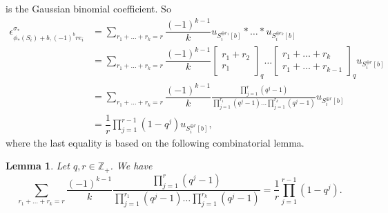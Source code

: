 \documentclass[a4paper,12pt]{amsart}
\numberwithin{equation}{section}
\newtheorem{lemma}[theorem]{Lemma}
\newcommand{\1}{\mathbf{1}}
\begin{document}
is the Gaussian binomial coefficient. So
\begin{align*}
    \epsilon^{\sigma_*}_{\phi_*(S_i)+b,(-1)^b re_i}
    &=\sum_{r_1+\dots+r_k=r}\dfrac{(-1)^{k-1}}{k}u_{S_i^{\oplus r_1}[b]}*\dots*u_{S_i^{\oplus r_k}[b]}\\
    &=\sum_{r_1+\dots+r_k=r}\dfrac{(-1)^{k-1}}{k}\left[\begin{array}{c}
     r_1+r_2  \\
     r_1 
\end{array}\right]_q\dots\left[\begin{array}{c}
     r_1+\dots+r_k  \\
     r_1+\dots+r_{k-1}
\end{array}\right]_q u_{S_i^{\oplus r}[b]}\\
&=\sum_{r_1+\dots+r_k=r}\dfrac{(-1)^{k-1}}{k}\frac{\displaystyle{\prod_{j=1}^{r}(q^j-1)}}{\displaystyle{\prod_{j=1}^{r_1}(q^j-1)\dots\prod_{j=1}^{r_k}(q^j-1)}}u_{S_i^{\oplus r}[b]}\\
&=\dfrac{1}{r}\prod_{j=1}^{r-1}(1-q^j)u_{S_i^{\oplus r}[b]},
\end{align*}
where the last equality is based on the following combinatorial lemma.
\begin{lemma}
    Let $q,r\in\mathbb{Z}_+$. We have
    \[\sum_{r_1+\dots+r_k=r}\dfrac{(-1)^{k-1}}{k}\frac{\displaystyle{\prod_{j=1}^{r}(q^j-1)}}{\displaystyle{\prod_{j=1}^{r_1}(q^j-1)\dots\prod_{j=1}^{r_k}(q^j-1)}}=\dfrac{1}{r}\prod_{j=1}^{r-1}(1-q^j).\]
\end{lemma}
\end{document}
